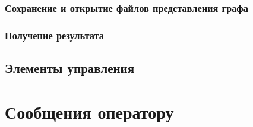 \documentclass[a4paper,12pt]{article}
\begin{document}
	\subsubsection{Сохранение и открытие файлов представления графа}
	\subsubsection{Получение результата}
	\subsection{Элементы управления}
	
						\newpage
	\section{Сообщения оператору}

						\newpage
	\listRegistration
\end{document}
